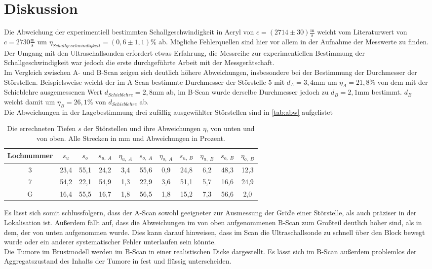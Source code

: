 \section{Diskussion}
\label{sec:Diskussion}


Die Abweichung der experimentiell bestimmten Schallgeschwindigkeit in Acryl von $c = (2714 \pm 30) \mathrm{\frac{m}{s}}$ weicht vom Literaturwert von $c = 2730 \mathrm{\frac{m}{s}}$ um
$\eta_{Schallgeschwindigkeit} = (0,6 \pm 1,1) \%$ ab. Mögliche Fehlerquellen sind hier vor allem in der Aufnahme der Messwerte zu finden. 
Der Umgang mit den Ultraschallsonden erfordert etwas Erfahrung, die Messreihe zur experimentiellen Bestimmung der Schallgeschwindigkeit
war jedoch die erste durchgeführte Arbeit mit der Messgerätschaft.\\

Im Vergleich zwischen A- und B-Scan zeigen sich deutlich höhere Abweichungen, insbesondere bei der Bestimmung der Durchmesser der 
Störstellen. Beispielsweise weicht der im A-Scan bestimmte Durchmesser der Störstelle 5 mit $d_A = 3,4$mm um $\eta_A = 21,8 \%$ von dem mit der 
Schieblehre ausgemessenen Wert $d_{Schieblehre} = 2,8$mm ab, im B-Scan wurde derselbe Durchmesser jedoch zu $d_B = 2,1$mm bestimmt. $d_B$ weicht damit 
um $\eta_B = 26,1 \%$ von $d_{Schieblehre}$ ab.\\
Die Abweichungen in der Lagebestimmung drei zufällig ausgewählter Störstellen sind in \autoref{tab:abw} aufgelistet
\begin{table}[H]
    \centering
    \caption{Die errechneten Tiefen $s$ der Störstellen und ihre Abweichungen $\eta$, von unten und von oben. Alle Strecken in mm und Abweichungen in Prozent.}
    \begin{tabular}{ccccccccccc}
      \toprule
      {Lochnummer} & 
      {$s_{u}$} &
      {$s_{o}$} &
      {$s_{u, \; A}$} &
      {$\eta_{u, \; A}$} &
      {$s_{o, \; A}$} &      
      {$\eta_{o, \; A}$} &
      {$s_{u, \; B}$} &
      {$\eta_{u, \; B}$} &
      {$s_{o, \; B}$} &      
      {$\eta_{o, \; B}$} \\
      \midrule
      3  &  23,4  & 55,1  &  24,2   &  3,4  & 55,6  &  0,9  &  24,8 &  6,2   &  48,3 &  12,3  \\
      7  &  54,2  & 22,1  &  54,9   &  1,3  & 22,9  &  3,6  &  51,1 &  5,7   &  16,6 &  24,9  \\
      G  &  16,4  & 55,5  &  16,7   &  1,8  & 56,5  &  1,8  &  15,2 &  7,3   &  56,6 &   2,0  \\
      \bottomrule
    \end{tabular}
 \label{tab:abw}
\end{table}
\noindent
Es lässt sich somit schlussfolgern, dass der A-Scan sowohl geeigneter zur Ausmessung der Größe einer Störstelle, als auch 
präziser in der Lokalisation ist. 
Außerdem fällt auf, dass die Abweichungen im von oben aufgenommenen B-Scan zum Großteil deutlich höher sind, als in dem, der von unten aufgenommen wurde.
Dies kann darauf hinweisen, dass im Scan die Ultraschallsonde zu schnell über den Block bewegt wurde oder ein anderer systematischer 
Fehler unterlaufen sein könnte.\\ 

Die Tumore im Brustmodell werden im B-Scan in einer realistischen Dicke dargestellt.
Es lässt sich im B-Scan außerdem problemlos der Aggregatszustand des Inhalts der Tumore in fest und flüssig unterscheiden. 